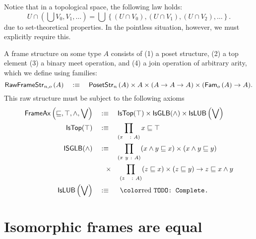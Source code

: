 Notice that in a topological space, the following law holds:
\begin{equation*}
  U \cap \left( \bigcup V_0, V_1, \ldots \right) = \bigcup\left\{ (U \cap V_0), (U \cap V_1), (U \cap V_2) , \ldots \right\}.
\end{equation*}
due to set-theoretical properties. In the pointless situation, however, we must explicitly
require this.

\begin{defn}[Frame]\label{defn:frame}
  A frame structure on some type $A$ consists of (1) a poset structure, (2) a top element
  (3) a binary meet operation, and (4) a join operation of arbitrary arity, which we
  define using families:
  \begin{equation*}
    \mathsf{RawFrameStr}{}_{n, o}\left(A\right) \quad:\equiv\quad \mathsf{PosetStr}{}_{n}\left(A\right) \times A \times (A \rightarrow A \rightarrow A) \times (\mathsf{Fam}_{o}\left(A\right) \rightarrow A).
  \end{equation*}
  This raw structure must be subject to the following axioms
  \begin{align*}
    \frameax{\sqsubseteq, \top, \wedge, \bigvee} \quad&\is\quad
      \mathsf{IsTop}(\top) \times \mathsf{IsGLB}(\wedge) \times \mathsf{IsLUB}\left(\bigvee\right)\\
    \mathsf{IsTop}(\top) \quad&\is\quad \pity{x~~}{A}{x \sqsubseteq \top}\\
    \mathsf{ISGLB}(\wedge) \quad&\is\quad \pity{x~y}{A}{(x \wedge y \sqsubseteq x) \times (x \wedge y \sqsubseteq y)}\\
                       &\hspace{0.7em}\times\quad \pity{z~~}{A}{(z \sqsubseteq x) \times (z \sqsubseteq y) \rightarrow z \sqsubseteq x \wedge y}\\
    \mathsf{IsLUB}\left(\bigvee\right) \quad&\is\quad \text{\todo{Complete.}}
  \end{align*}
\end{defn}

\section{Isomorphic frames are equal}\label{sec:frame-univ}


